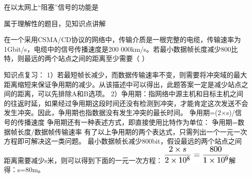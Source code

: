 \question 在以太网上``阻塞''信号的功能是
\par{}
\begin{solution}属于理解性的题目，见知识点讲解
\end{solution}
\question 在一个采用CSMA/CD协议的网络中，传输介质是一根完整的电缆，传输速率为1Gbit/s，电缆中的信号传播速度是200
000km/s。若最小数据帧长度减少800比特，则最远的两个站点之间的距离至少需要（
）
\par{}
\begin{solution}知识点复习：
1）若最短帧长减少，而数据传输速率不变，则需要将冲突域的最大距离缩短来保证争用期的减少。从该描述中可以得出，此题答案一定是减少站点之间的距离，可以先排除A和B选项。
2）争用期：指网络中源主机和目标主机之间的往返时延，如果经过争用期这段时间还没有检测到冲突，才能肯定这次发送不会发生冲突。因此，争用期也指数据没有发生冲突的最长时间。
争用期=(2×s)/信号的传播速度
争用期还有一种表述方式，即直接使用比特作为单位：
争用期=数据帧长度/数据帧传输速率
有了以上争用期的两个表达式，只需列出一个一元一次方程即可解决这一类问题。
最小数据帧长减少800bit，假设最远的两个站点之间距离需要减少s米，则可以得到下面的一元一次方程：
\includegraphics[width=1.37500in,height=0.36458in]{texmath/5dab885Cdpi7B3507D5Cfrac7B25Ctimes7Bs7D7D7B25Ctimes105E87D3D5Cfrac7B8007D7B15Ctimes105E97D}解得：s=80m。
\end{solution}
